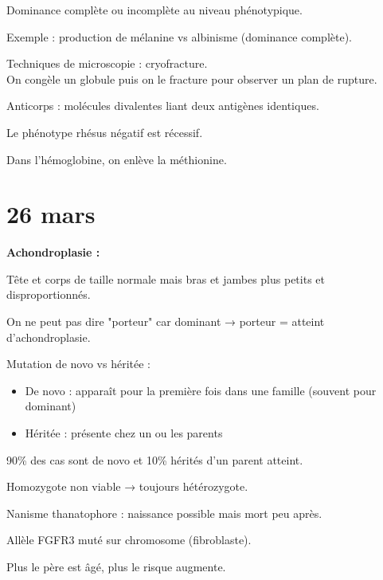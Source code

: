 \documentclass[11pt]{article}
\begin{document}
Dominance complète ou incomplète au niveau phénotypique.

Exemple : production de mélanine vs albinisme (dominance complète).

\vspace{0.3cm}

Techniques de microscopie : cryofracture.\\
On congèle un globule puis on le fracture pour observer un plan de rupture.

\vspace{0.3cm}

Anticorps : molécules divalentes liant deux antigènes identiques.

\vspace{0.3cm}

Le phénotype rhésus négatif est récessif.

\vspace{0.3cm}

Dans l'hémoglobine, on enlève la méthionine.




\section*{26 mars}

\textbf{Achondroplasie :}

Tête et corps de taille normale mais bras et jambes plus petits et disproportionnés.

On ne peut pas dire "porteur" car dominant → porteur = atteint d'achondroplasie.

\vspace{0.3cm}

Mutation de novo vs héritée :
\begin{itemize}
    \item De novo : apparaît pour la première fois dans une famille (souvent pour dominant)
    \item Héritée : présente chez un ou les parents
\end{itemize}

90\% des cas sont de novo et 10\% hérités d'un parent atteint.

Homozygote non viable → toujours hétérozygote.

Nanisme thanatophore : naissance possible mais mort peu après.

Allèle FGFR3 muté sur chromosome (fibroblaste).

Plus le père est âgé, plus le risque augmente.
\end{document}
